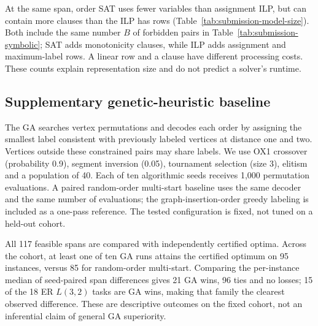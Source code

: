 \begin{table}[htbp]
\centering\small
\caption{Model sizes at a common label domain.}
\label{tab:submission-model-size}

\end{table}

At the same span, order SAT uses fewer variables than assignment ILP,
but can contain more clauses than the ILP has rows
(Table~\ref{tab:submission-model-size}). Both include the same number
$B$ of forbidden pairs in Table~\ref{tab:submission-symbolic}; SAT adds
monotonicity clauses, while ILP adds assignment and maximum-label rows.
A linear row and a clause have different processing costs. These counts
explain representation size and do not predict a solver's runtime.


\subsection{Supplementary genetic-heuristic baseline}
The GA searches vertex permutations and decodes each order by assigning the
smallest label consistent with previously labeled vertices at distance one
and two. Vertices outside these constrained pairs may share labels. We use
OX1 crossover (probability 0.9), segment inversion (0.05), tournament
selection (size 3), elitism and a population of 40. Each of ten algorithmic
seeds receives 1,000 permutation evaluations. A paired random-order
multi-start baseline uses the same decoder and the same number of evaluations;
the graph-insertion-order greedy labeling is included as a one-pass reference.
The tested configuration is fixed, not tuned on a held-out cohort.

All 117 feasible spans are compared with independently certified optima.
Across the cohort, at least one of ten GA runs attains the certified optimum
on 95 instances, versus 85 for random-order multi-start. Comparing the
per-instance median of seed-paired span differences gives 21 GA wins, 96 ties
and no losses; 15 of the 18 ER $L(3,2)$ tasks are GA wins, making that family
the clearest observed difference. These are descriptive outcomes on the
fixed cohort, not an inferential claim of general GA superiority.

